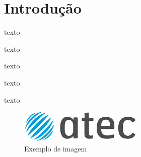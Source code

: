 \section{Introdução} \label{section: Introducao}
texto
\par \vspace{6pt}
texto
\par \vspace{6pt}
texto
\par \vspace{6pt}
texto
\par \vspace{6pt}
texto
\par \vspace{6pt}

\begin{figure}[H]
    \centering
    \includegraphics[width=\textwidth]{Figures/0. General/atec_2.png}
    \caption{Exemplo de imagem}
    \label{Exemplo de imagem}
\end{figure}